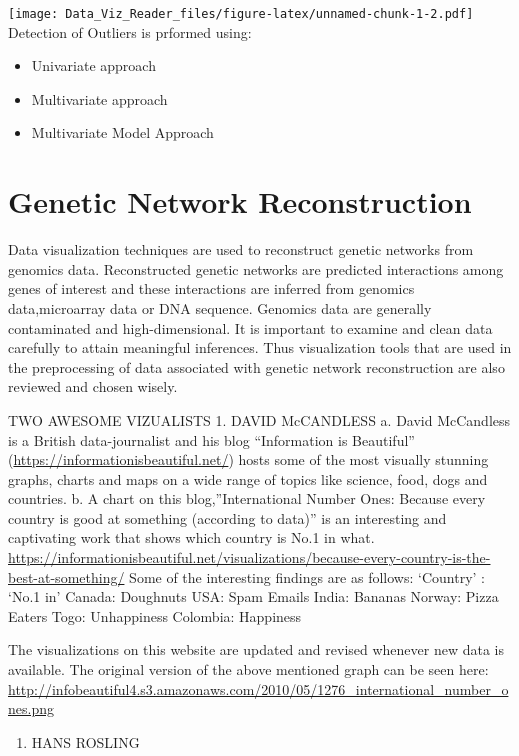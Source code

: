 \documentclass[]{book}
\providecommand{\tightlist}{%
  \setlength{\itemsep}{0pt}\setlength{\parskip}{0pt}}
\theoremstyle{definition}
\theoremstyle{definition}
\theoremstyle{definition}
\theoremstyle{remark}
\begin{document}
\texttt{[image: Data\_Viz\_Reader\_files/figure-latex/unnamed-chunk-1-2.pdf]}
Detection of Outliers is prformed using:

\begin{itemize}
\tightlist
\item
  Univariate approach
\item
  Multivariate approach
\item
  Multivariate Model Approach
\end{itemize}

\section{Genetic Network
Reconstruction}\label{genetic-network-reconstruction}

Data visualization techniques are used to reconstruct genetic networks
from genomics data. Reconstructed genetic networks are predicted
interactions among genes of interest and these interactions are inferred
from genomics data,microarray data or DNA sequence. Genomics data are
generally contaminated and high-dimensional. It is important to examine
and clean data carefully to attain meaningful inferences. Thus
visualization tools that are used in the preprocessing of data
associated with genetic network reconstruction are also reviewed and
chosen wisely.

TWO AWESOME VIZUALISTS 1. DAVID McCANDLESS a. David McCandless is a
British data-journalist and his blog ``Information is Beautiful''
(\url{https://informationisbeautiful.net/}) hosts some of the most
visually stunning graphs, charts and maps on a wide range of topics like
science, food, dogs and countries. b. A chart on this
blog,''International Number Ones: Because every country is good at
something (according to data)'' is an interesting and captivating work
that shows which country is No.1 in what.
\url{https://informationisbeautiful.net/visualizations/because-every-country-is-the-best-at-something/}
Some of the interesting findings are as follows: `Country' : `No.1 in'
Canada: Doughnuts USA: Spam Emails India: Bananas Norway: Pizza Eaters
Togo: Unhappiness Colombia: Happiness

The visualizations on this website are updated and revised whenever new
data is available. The original version of the above mentioned graph can
be seen here:
\url{http://infobeautiful4.s3.amazonaws.com/2010/05/1276_international_number_ones.png}

\begin{enumerate}
\def\labelenumi{\arabic{enumi}.}
\setcounter{enumi}{1}
\tightlist
\item
  HANS ROSLING
\end{enumerate}
\end{document}
